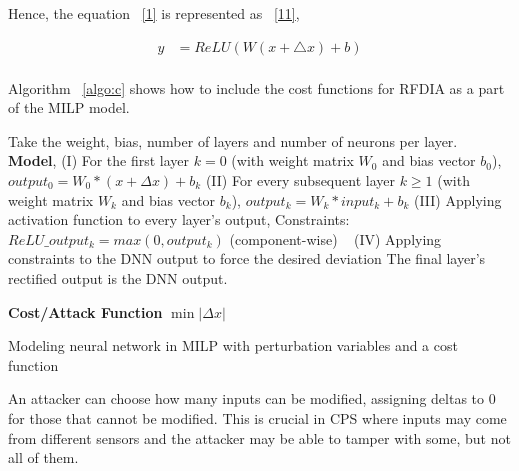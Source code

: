 Hence, the equation ~\ref{1} is represented as ~\ref{11},

\begin{align}
\label{11}
y &=  ReLU(W(x + \bigtriangleup  x ) + b)\\
\end{align}

Algorithm ~\ref{algo:c} shows how to include the cost functions for \ac{RFDIA} as a part of the MILP model. 
 
\begin{algorithm}
	Take the weight, bias, number of layers and number of neurons per layer. \\
	
	\textbf{Model}, \linebreak
	(I) For the first layer $k = 0$ (with weight matrix $W_0$ and bias vector $b_0$), $output_0 = W_0 * (x + \Delta x) + b_k$
	\linebreak
	(II) For every subsequent layer $k \geq 1$ (with weight matrix $W_k$ and bias vector $b_k$), $output_k = W_k * input_k + b_k$
	\linebreak
	(III) Applying activation function to every layer's output,
	\linebreak
	Constraints: $ReLU\_output_k = max(0, output_k)$ (component-wise) \
	\linebreak
	(IV) Applying constraints to the DNN output to force the desired deviation
	\linebreak
	The final layer's rectified output is the DNN output.
	
	\textbf{Cost/Attack Function} \linebreak
	$\min |\Delta x|$
	\caption{Modeling neural network in MILP with perturbation variables and a cost function}
	\label{algo:c}
\end{algorithm}

An attacker can choose how many inputs can be modified, assigning deltas to $0$ for those that cannot be modified. 
This is crucial in \ac{CPS} where inputs may come from different sensors and the attacker may be able to tamper with some, but not all of them.

